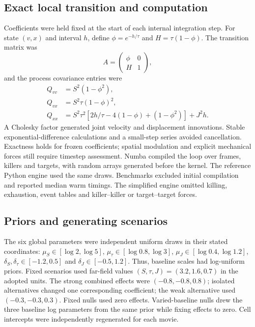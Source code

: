 \documentclass[12pt]{article}
\begin{document}
\subsection*{Exact local transition and computation}
Coefficients were held fixed at the start of each internal integration step. For state $(v,x)$ and interval $h$, define $\phi=e^{-h/\tau}$ and $H=\tau(1-\phi)$. The transition matrix was
\begin{equation}
 A=\begin{pmatrix}\phi&0\\H&1\end{pmatrix},
\end{equation}
and the process covariance entries were
\begin{align}
 Q_{vv}&=S^2(1-\phi^2),\\
 Q_{vx}&=S^2\tau(1-\phi)^2,\\
 Q_{xx}&=S^2\tau^2[2h/\tau-4(1-\phi)+(1-\phi^2)]+J^2h.
\end{align}
A Cholesky factor generated joint velocity and displacement innovations. Stable exponential-difference calculations and a small-step series avoided cancellation. Exactness holds for frozen coefficients; spatial modulation and explicit mechanical forces still require timestep assessment. Numba compiled the loop over frames, killers and targets, with random arrays generated before the kernel. The reference Python engine used the same draws. Benchmarks excluded initial compilation and reported median warm timings. The simplified engine omitted killing, exhaustion, event tables and killer--killer or target--target forces.

\subsection*{Priors and generating scenarios}
The six global parameters were independent uniform draws in their stated coordinates: $\mu_S\in[\log2,\log5]$, $\mu_\tau\in[\log0.8,\log3]$, $\mu_J\in[\log0.4,\log1.2]$, $\delta_S,\delta_\tau\in[-1.2,0.5]$ and $\delta_J\in[-0.5,1.2]$. Thus, baseline scales had log-uniform priors. Fixed scenarios used far-field values $(S,\tau,J)=(3.2,1.6,0.7)$ in the adopted units. The strong combined effects were $(-0.8,-0.8,0.8)$; isolated alternatives changed one corresponding coefficient; the weak alternative used $(-0.3,-0.3,0.3)$. Fixed nulls used zero effects. Varied-baseline nulls drew the three baseline log parameters from the same prior while fixing effects to zero. Cell intercepts were independently regenerated for each movie.
\end{document}
